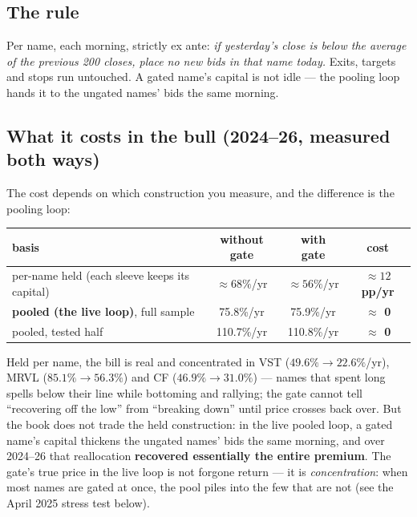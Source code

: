 \documentclass[11pt,a4paper]{article}
\newcommand{\good}[1]{{\color{bcteal}\textbf{#1}}}
\newcommand{\bad}[1]{{\color{bcred}\textbf{#1}}}
\begin{document}
\subsection{The rule}

Per name, each morning, strictly ex ante: \emph{if yesterday's close is below the
average of the previous 200 closes, place no new bids in that name today.}
Exits, targets and stops run untouched. A gated name's capital is not idle ---
the pooling loop hands it to the ungated names' bids the same morning.

\subsection{What it costs in the bull (2024--26, measured both ways)}

The cost depends on which construction you measure, and the difference is the
pooling loop:

\begin{center}
\begin{tabular}{lccc}
\toprule
basis & without gate & with gate & cost \\
\midrule
per-name held (each sleeve keeps its capital) & $\approx 68\%$/yr & $\approx 56\%$/yr & \bad{$\approx 12$pp/yr} \\
\textbf{pooled (the live loop)}, full sample  & 75.8\%/yr & 75.9\%/yr & \good{$\approx$ 0} \\
pooled, tested half                           & 110.7\%/yr & 110.8\%/yr & \good{$\approx$ 0} \\
\bottomrule
\end{tabular}
\end{center}

Held per name, the bill is real and concentrated in VST ($49.6\% \rightarrow
22.6\%$/yr), MRVL ($85.1\% \rightarrow 56.3\%$) and CF ($46.9\% \rightarrow
31.0\%$) --- names that spent long spells below their line while bottoming and
rallying; the gate cannot tell ``recovering off the low'' from ``breaking down''
until price crosses back over. But the book does not trade the held
construction: in the live pooled loop, a gated name's capital thickens the
ungated names' bids the same morning, and over 2024--26 that reallocation
\textbf{recovered essentially the entire premium}. The gate's true price in the
live loop is not forgone return --- it is \emph{concentration}: when most names
are gated at once, the pool piles into the few that are not (see the April 2025
stress test below).
\end{document}
